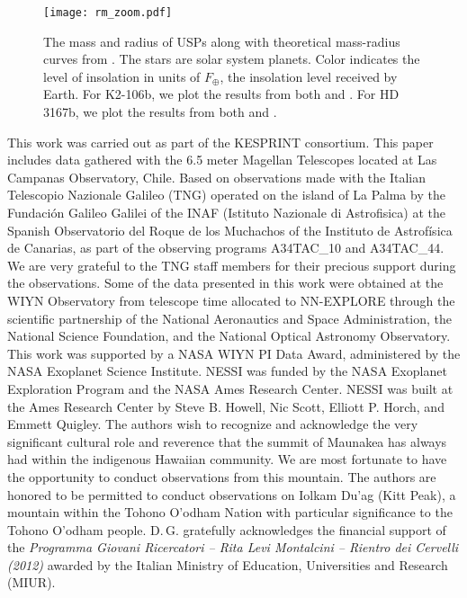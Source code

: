 \documentclass[twocolumn]{aastex61}
\begin{document}
\begin{figure*}
\begin{center}
\texttt{[image: rm\_zoom.pdf]}
\caption{The mass and radius of USPs along with theoretical mass-radius curves from \citet{Zeng2016}. The stars are solar system planets. Color indicates the level of insolation in units of $F_{\oplus}$, the insolation level received by Earth. For K2-106b, we plot the results from both \citet{Guenther2017} and \citet{Sinukoff2017}. For HD 3167b, we plot the results from both \citet{Christiansen2017} and \citet{Gandolfi2017}.}
\label{rm}
\end{center}
\end{figure*}





\acknowledgments
This work was carried out as part of the KESPRINT consortium. This paper includes data gathered with the 6.5 meter Magellan Telescopes located at Las Campanas Observatory, Chile. Based on observations made with the Italian Telescopio Nazionale Galileo (TNG) operated on the island of La Palma by the Fundaci\'on Galileo Galilei of the INAF (Istituto Nazionale di Astrofisica) at the Spanish Observatorio del Roque de los Muchachos of the Instituto de Astrof\'isica de Canarias, as part of the observing programs A34TAC\_10 and A34TAC\_44. We are very grateful to the TNG staff members for their precious support during the observations. Some of the data presented in this work were obtained at the WIYN Observatory from telescope time allocated to NN-EXPLORE through the scientific partnership of the National Aeronautics and Space Administration, the National Science Foundation, and the National Optical Astronomy Observatory. This work was supported by a NASA WIYN PI Data Award, administered by the NASA Exoplanet Science Institute. NESSI was funded by the NASA Exoplanet Exploration Program and the NASA Ames Research Center. NESSI was built at the Ames Research Center by Steve B. Howell, Nic Scott, Elliott P. Horch, and Emmett Quigley. The authors wish to recognize and acknowledge the very significant cultural role and reverence that the summit of Maunakea has always had within the indigenous Hawaiian community. We are most fortunate to have the opportunity to conduct observations from this mountain. The authors are honored to be permitted to conduct observations on Iolkam Du’ag (Kitt Peak), a mountain within the Tohono O'odham Nation with particular significance to the Tohono O'odham people. D.\,G. gratefully acknowledges the financial support of the \emph{Programma Giovani Ricercatori -- Rita Levi Montalcini -- Rientro dei Cervelli (2012)} awarded by the Italian Ministry of Education, Universities and Research (MIUR).
\end{document}
